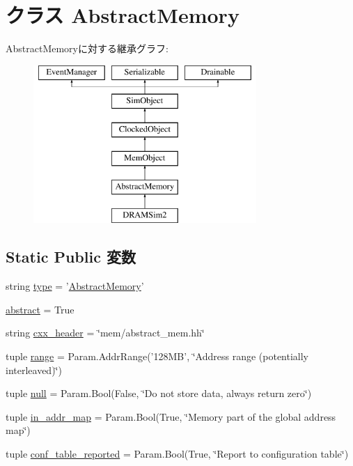 \hypertarget{classAbstractMemory_1_1AbstractMemory}{
\section{クラス AbstractMemory}
\label{classAbstractMemory_1_1AbstractMemory}
}
AbstractMemoryに対する継承グラフ:\begin{figure}[H]
\begin{center}
\leavevmode
\includegraphics[height=6cm]{classAbstractMemory_1_1AbstractMemory}
\end{center}
\end{figure}
\subsection*{Static Public 変数}
\begin{DoxyCompactItemize}
\item 
string \hyperlink{classAbstractMemory_1_1AbstractMemory_acce15679d830831b0bbe8ebc2a60b2ca}{type} = '\hyperlink{classAbstractMemory_1_1AbstractMemory}{AbstractMemory}'
\item 
\hyperlink{classAbstractMemory_1_1AbstractMemory_a17fa61ac3806b481cafee5593b55e5d0}{abstract} = True
\item 
string \hyperlink{classAbstractMemory_1_1AbstractMemory_a17da7064bc5c518791f0c891eff05fda}{cxx\_\-header} = \char`\"{}mem/abstract\_\-mem.hh\char`\"{}
\item 
tuple \hyperlink{classAbstractMemory_1_1AbstractMemory_ae7aca7a468be02fee9f4e8d0af49932f}{range} = Param.AddrRange('128MB', \char`\"{}Address range (potentially interleaved)\char`\"{})
\item 
tuple \hyperlink{classAbstractMemory_1_1AbstractMemory_ab4d728107c8135f96ef3cb8c84621e90}{null} = Param.Bool(False, \char`\"{}Do not store data, always return zero\char`\"{})
\item 
tuple \hyperlink{classAbstractMemory_1_1AbstractMemory_a19b298706aab3f429aaf3d3e719613b3}{in\_\-addr\_\-map} = Param.Bool(True, \char`\"{}Memory part of the global address map\char`\"{})
\item 
tuple \hyperlink{classAbstractMemory_1_1AbstractMemory_a1d30f6c6ac50b7718dd64b8e7f9a0016}{conf\_\-table\_\-reported} = Param.Bool(True, \char`\"{}Report to configuration table\char`\"{})
\end{DoxyCompactItemize}


